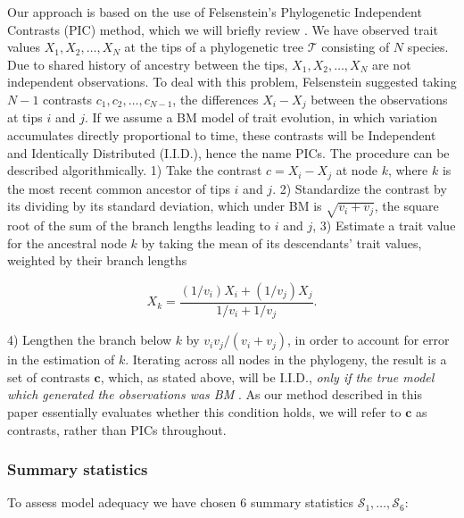 \documentclass[12pt]{article}
\begin{document}
Our approach is based on the use of Felsenstein's \citeyear{Felsenstein1973, Felsenstein1985} Phylogenetic Independent Contrasts (PIC) method, which we will briefly review \citep[for more details, see][]{Rohlf2001, Blomberg2012}. We have observed trait values $X_1, X_2, \ldots, X_N$ at the tips of a phylogenetic tree $\mathcal{T}$ consisting of $N$ species. Due to shared history of ancestry between the tips, $X_1, X_2, \ldots, X_N$ are not independent observations. To deal with this problem, Felsenstein suggested taking $N-1$ contrasts $c_1, c_2, \ldots, c_{N-1}$, the differences $X_{i} - X_{j}$ between the observations at tips $i$ and $j$. If we assume a BM model of trait evolution, in which variation accumulates directly proportional to time, these contrasts will be Independent and Identically Distributed (I.I.D.), hence the name PICs. The procedure can be described algorithmically. 1) Take the contrast $c = X_i - X_j$ at node $k$, where $k$ is the most recent common ancestor of tips $i$ and $j$. 2) Standardize the contrast by its dividing by its standard deviation, which under BM is $\sqrt{v_i + v_j}$, the square root of the sum of the branch lengths leading to $i$ and $j$, 3) Estimate a trait value for the ancestral node $k$ by taking the mean of its descendants' trait values, weighted by their branch lengths

\begin{equation}
X_k = \frac{(1 / v_i)X_i + (1 / v_j)X_j}{1/v_i + 1/v_j}.
\end{equation}

4) Lengthen the branch below $k$ by $v_i v_j / (v_i + v_j)$, in order to account for error in the estimation of $k$. Iterating across all nodes in the phylogeny, the result is a set of contrasts $\mathbf{c}$, which, as stated above, will be I.I.D., \textit{only if the true model which generated the observations was BM} \citep{Rohlf2001}. As our method described in this paper essentially evaluates whether this condition holds, we will refer to $\mathbf{c}$ as contrasts, rather than PICs throughout. 

\subsubsection{Summary statistics}

To assess model adequacy we have chosen 6 summary statistics $\mathcal{S}_1, \ldots, \mathcal{S}_6$:
\end{document}
